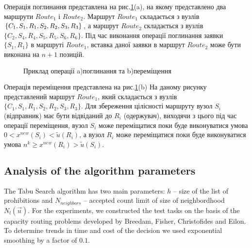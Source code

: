 \documentclass[]{TAACpaper}
\begin{document}
Операція поглинання представлена на рис.\ref{ris:figures}(a), на якому представлено два маршрути $Route_1$ і $Route_2$. Маршрут $Route_1$ складається з вузлів $\{C_1,S_1,R_1,S_2,\\R_2,S_3,R_3\}$, а маршрут $Route_2$ складається з вузлів $\{C_2,S_4,R_4,S_5,R_5,S_6,R_6\}$. Під час виконання операції поглинання заявки $\{S_1,R_1\}$ в маршруті $Route_1$, вставка даної заявки в маршрут $Route_2$ може бути виконана на $n+1$ позицій. 

\begin{figure}[h]
	\caption{Приклад операції a)поглинання та b)переміщення}
	\label{ris:figures}
\end{figure}

Операція переміщення представлена на рис.\ref{ris:figures}(b) На даному рисунку представлений маршрут $Route_1$, який складається з вузлів $\{C_1,S_1,R_1,S_2,R_2,S_3,R_3\}$. Для збереження цілісності маршруту вузол $S_i$ (відправник) має бути відвіданий до $R_i$ (одержувач), виходячи з цього під час операції переміщення, вузол $S_i$ може переміщатися поки буде виконуватися умова $0<x^{new}(S_i)<\widetilde{u}(R_i)$, а вузол $R_i$ може переміщатися поки буде виконуватися умова $n^k \geq x^{new}(R_i)>\widetilde{u}(S_i)$.

\subsection{Analysis of the algorithm parameters}
The Tabu Search algorithm has two main parameters: $h$ -- size of the list of prohibitions and $N_{neighbors}$ -- accepted count limit of size of neighbordhood $N_l(\vec{u})$. For the experiments, we constructed the test tasks on the basis of the capacity routing problems developed by Breedam, Fisher, Christofides and Eilon. To determine trends in time and cost of the decision we used exponential smoothing by a factor of $0.1$.
\end{document}
